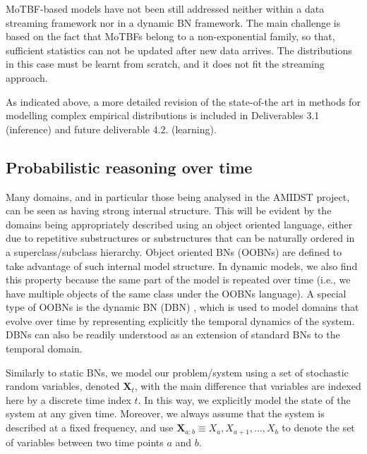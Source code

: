 MoTBF-based models have not been still addressed neither within a data streaming framework nor in a dynamic BN framework. The main challenge is based on the fact that MoTBFs belong to a non-exponential family, so that, sufficient statistics can not be updated after new data arrives. The distributions in this case must be learnt from scratch, and it does not fit the streaming approach. 

As indicated above, a more detailed revision of the state-of-the art in methods for modelling complex empirical distributions is included in Deliverables 3.1 (inference) and future deliverable 4.2. (learning).



\subsection{Probabilistic reasoning over time}\label{SubSection:DBNs}

Many domains, and in particular those being analysed in the AMIDST project, can be seen as having strong internal structure. This will be evident by the domains being appropriately described using an object oriented language, either due to repetitive substructures or substructures that can be naturally ordered in a superclass/subclass hierarchy.  Object oriented BNs \cite{KollerPfeffer1997} (OOBNs) are defined to take advantage of such internal model structure. In dynamic models, we also find this property because the same part of the model is repeated over time (i.e., we have multiple objects of the same class under the OOBNs language). A special type of OOBNs is the dynamic BN (DBN) \cite{DeanKanazawa1989}, which is used to model domains that evolve over time by representing explicitly the temporal dynamics of the system. DBNs can also be readily understood as an extension of standard BNs to the temporal domain. 

Similarly to static BNs, we model our problem/system using a set of stochastic random variables, denoted $\bm X_t$, with the main difference that variables are indexed here by a discrete time index $t$. In this way, we explicitly model the state of the system at any given time. Moreover, we always assume that the system is described at a fixed frequency, and use $\bm X_{a:b} \equiv X_a,X_{a+1},\ldots,X_{b}$ to denote the set of variables between two time points $a$ and $b$.  


